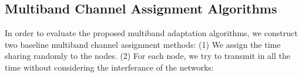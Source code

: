 \subsection{Multiband Channel Assignment Algorithms}
In order to evaluate the proposed multiband adaptation algorithms, 
we construct two baseline multiband channel assignment methods: (1) We assign the
time sharing randomly to the nodes. (2) For each node, we try to transmit in all the time without considering the interferance of the networks: 










